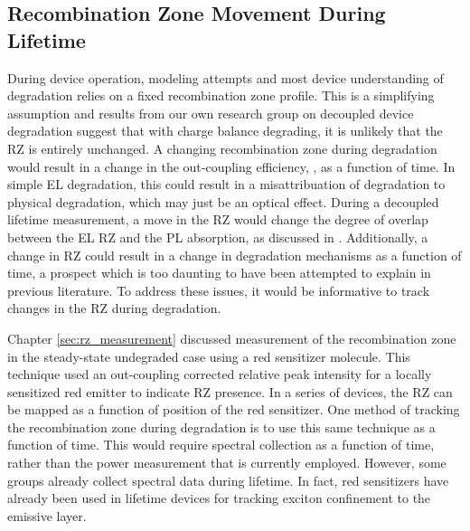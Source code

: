 \documentclass[../thesis.tex]{subfiles}
\begin{document}
\subsection{Recombination Zone Movement During Lifetime}

During device operation, modeling attempts and most device understanding of degradation relies on a fixed recombination zone profile.\supercite{Ingram2017,Scholz2015,Giebink2009a,Giebink2008a}
This is a simplifying assumption and results from our own research group on decoupled device degradation suggest that with charge balance degrading, it is unlikely that the RZ is entirely unchanged.\supercite{Bangsund2018,Hershey2017,Bangsund2018a}
A changing recombination zone during degradation would result in a change in the out-coupling efficiency, \oc, as a function of time.  
In simple EL degradation, this could result in a misattribuation of degradation to physical degradation, which may just be an optical effect.
During a decoupled lifetime measurement, a move in the RZ would change the degree of overlap between the EL RZ and the PL absorption, as discussed in \textcite{Bangsund2018}.
Additionally, a change in RZ could result in a change in degradation mechanisms as a function of time, a prospect which is too daunting to have been attempted to explain in previous literature.
To address these issues, it would be informative to track changes in the RZ during degradation.

Chapter \ref{sec:rz_measurement} discussed measurement of the recombination zone in the steady-state undegraded case using a red sensitizer molecule.
This technique used an out-coupling corrected relative peak intensity for a locally sensitized red emitter to indicate RZ presence.
In a series of devices, the RZ can be mapped as a function of position of the red sensitizer.\supercite{Bangsund2018,Hershey2017}
One method of tracking the recombination zone during degradation is to use this same technique as a function of time.
This would require spectral collection as a function of time, rather than the power measurement that is currently employed.  
However, some groups already collect spectral data during lifetime.\supercite{Zhang2017a,Yu2017,Zhang2016b}
In fact, red sensitizers have already been used in lifetime devices for tracking exciton confinement to the emissive layer.\supercite{Coburn2017}
\end{document}
